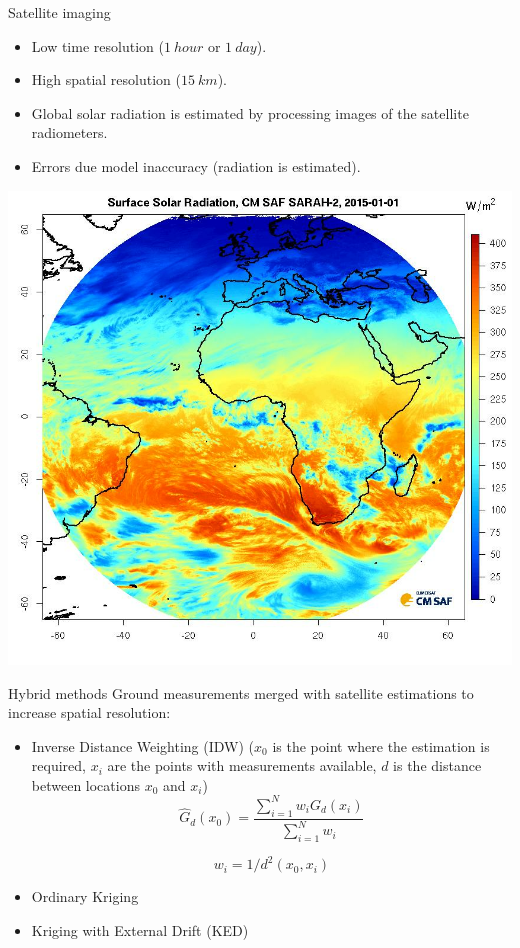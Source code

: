 \documentclass[xcolor={usenames,svgnames,dvipsnames}]{beamer}
\begin{document}
\begin{frame}[label={sec:org5bfdece}]{Satellite imaging}
\begin{itemize}
\item Low time resolution (\(\SI{1}{hour}\) or \(\SI{1}{day}\)).

\item High spatial resolution (\(\SI{15}{km}\)).

\item Global solar radiation is estimated by processing images of the satellite radiometers.

\item Errors due model inaccuracy (radiation is estimated).
\end{itemize}
\begin{center}
\includegraphics[height=0.5\textheight]{../figs/satellite.png}
\end{center}
\end{frame}

\begin{frame}[label={sec:orga2b1e0c}]{Hybrid methods}
Ground measurements merged with satellite estimations to increase spatial resolution:
\begin{itemize}
\item \alert{Inverse Distance Weighting (IDW)} (\(x_0\) is the point where the estimation is required, \(x_i\) are the points with measurements available, \(d\) is the distance between locations \(x_0\) and \(x_i\))
\[
\widehat{G}_d(x_0) = \frac{\sum_{i=1}^N w_i G_{d}(x_i)}{\sum_{i=1}^N w_i} 
\]

\[
  w_i = 1/d^2(x_0, x_i)
\]
\item \alert{Ordinary Kriging}
\item \alert{Kriging with External Drift (KED)}
\end{itemize}
\end{frame}
\end{document}
